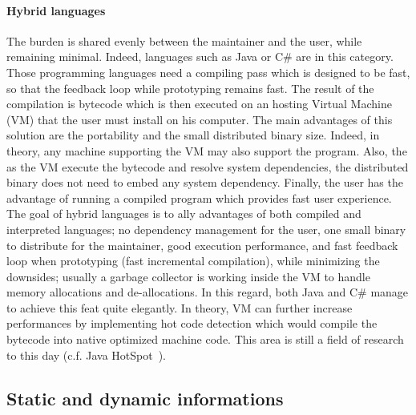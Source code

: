 \paragraph{Hybrid languages} The burden is shared evenly between the maintainer and the user, while remaining minimal.
Indeed, languages such as Java or C\# are in this category. Those programming languages need a compiling pass which is
designed to be fast, so that the feedback loop while prototyping remains fast. The result of the compilation is bytecode
which is then executed on an hosting Virtual Machine (VM) that the user must install on his computer. The main
advantages of this solution are the portability and the small distributed binary size. Indeed, in theory, any machine
supporting the VM may also support the program. Also, the as the VM execute the bytecode and resolve system
dependencies, the distributed binary does not need to embed any system dependency. Finally, the user has the advantage
of running a compiled program which provides fast user experience. The goal of hybrid languages is to ally advantages of
both compiled and interpreted languages; no dependency management for the user, one small binary to distribute for the
maintainer, good execution performance, and fast feedback loop when prototyping (fast incremental compilation), while
minimizing the downsides; usually a garbage collector is working inside the VM to handle memory allocations and
de-allocations. In this regard, both Java and C\# manage to achieve this feat quite elegantly. In theory, VM can further
increase performances by implementing hot code detection which would compile the bytecode into native optimized machine
code. This area is still a field of research to this day (c.f. Java
HotSpot~\parencite{xie.improving,kotzmann.2008.hotspot,halli.2016.java-hpc}).


\subsection{Static and dynamic informations}

